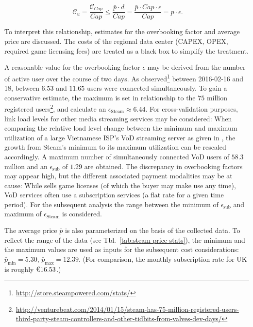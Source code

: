 \begin{equation}
  \phantom{\text{.}}\mathcal{C}_u = \frac{\mathcal{C}_{Cap}}{Cap} \leq \frac{\bar{p} \cdot d}{Cap} = \frac{\bar{p} \cdot Cap \cdot \epsilon}{Cap} = \bar{p} \cdot \epsilon\text{.}
\end{equation}

To interpret this relationship, estimates for the overbooking factor and average price are discussed. The costs of the regional data center (\gls{CAPEX}, \gls{OPEX}, required game licensing fees) are treated as a black box to simplify the treatment.

A reasonable value for the overbooking factor $\epsilon$ may be derived from the number of active \steam user over the course of two days. As observed\footnote{\url{http://store.steampowered.com/stats/}} between 2016-02-16 and 18, between $6.53$\si{\mega} and $11.65$\si{\mega} users were connected simultaneously. To gain a conservative estimate, the maximum is set in relationship to the $75$ million registered \steam users\footnote{\url{http://venturebeat.com/2014/01/15/steam-has-75-million-registered-users-third-party-steam-controllers-and-other-tidbits-from-valves-dev-days/}}, and calculate an $\epsilon_{\text{Steam}}\approx6.44$. For cross-validation purposes, link load levels for other media streaming services may be considered: When comparing the relative load level change between the minimum and maximum utilization of a large Vietnamese \acrshort{ISP}'s \gls{VoD} streaming server as given in \cite{thanh2012enabling}%
, the growth from Steam's minimum to its maximum utilization can be rescaled accordingly. A maximum number of simultaneously connected \gls{VoD} users of $58.3$ million and an $\epsilon_{\text{sub}}$ of $1.29$ are obtained. The discrepancy in overbooking factors may appear high, but the different associated payment modalities may be at cause: While \steam sells game licenses (of which the buyer may make use any time), \gls{VoD} services often use a subscription services (a flat rate for a given time period). For the subsequent analysis the range between the minimum of $\epsilon_{\text{sub}}$ and maximum of $\epsilon_{\text{Steam}}$ is considered.

The average price $\bar{p}$ is also parameterized on the basis of the collected \steam data. %
To reflect the range of the data (see Tbl.~\ref{tab:steam-price-stats}), the minimum and the maximum values are used as inputs for the subsequent cost considerations: $\bar{p}_{\text{min}} = 5.30$, $\bar{p}_{\text{max}} = 12.39$. (For comparison, the monthly subscription rate for \psnow UK is roughly $\text{\texteuro} 16.53$.)

